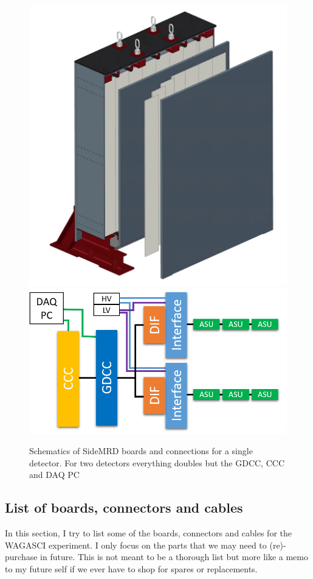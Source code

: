 \begin{figure}[H]
\begin{minipage}{0.48\linewidth}
    \includegraphics[width=0.8\linewidth]{SideMRD-open-view} \\
    \includegraphics[width=0.98\linewidth]{DAQ-overview-SideMRD}
    \caption{\small Schematics of SideMRD boards and connections for a single
      detector. For two detectors everything doubles but the GDCC, CCC and DAQ
      PC}\label{fig:DAQ-overview-SideMRD}
  \end{minipage}
\end{figure}

\subsection{List of boards, connectors and cables}
In this section, I try to list some of the boards, connectors and cables for the
WAGASCI experiment. I only focus on the parts that we may need to (re)-purchase
in future. This is not meant to be a thorough list but more like a memo to my future
self if we ever have to shop for spares or replacements.

